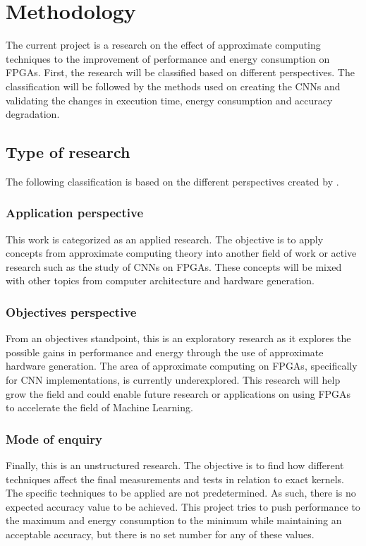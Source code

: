 \chapter{Methodology}
\label{ch:metodologia}

The current project is a research on the effect of approximate computing 
techniques to the improvement of performance and energy consumption
on FPGAs. First, the research will be classified based on different perspectives. 
The classification will be
followed by the methods used on creating the CNNs and validating the
changes in execution time, energy consumption and accuracy degradation.

\section{Type of research}

The following classification is based on the different perspectives 
created by \cite{kumar2019research}.

\subsection{Application perspective}

This work is categorized as an applied research. 
The objective is to apply concepts from approximate computing theory
into another field of work or active research such as the study of CNNs on FPGAs.
These concepts will be mixed with other topics from computer architecture
and hardware generation.

\subsection{Objectives perspective}

From an objectives standpoint, this is an exploratory research as it explores the possible 
gains in performance and energy through the use of approximate hardware generation.
The area of approximate computing on FPGAs, specifically for CNN implementations, is currently
underexplored. This research will help grow the field and could enable future research
or applications on using FPGAs to accelerate the field of Machine Learning.

\subsection{Mode of enquiry}

Finally, this is an unstructured research. The objective is to find how different techniques
affect the final measurements and tests in relation to exact kernels. The specific techniques
to be applied are not predetermined. As such, there is no expected accuracy value to be achieved. 
This project tries to 
push performance to the maximum and energy consumption
to the minimum while maintaining an acceptable accuracy, but there is no set number for
any of these values.

